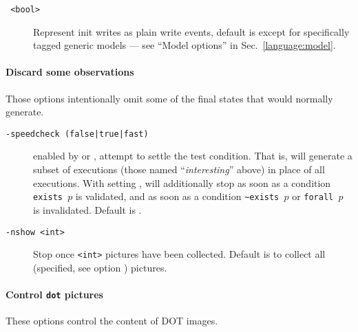 \begin{description}
\item[{\tt {} <bool>}]
Represent init writes as plain write events, default is  except
for specifically tagged generic models --- see ``Model options''
in Sec.~\ref{language:model}.


\end{description}

\paragraph*{Discard some observations}
Those options intentionally omit some of the final states that \herd{} would
normally generate.

\begin{description}
\item[{\tt -speedcheck (false|true|fast)}] 
 enabled by 
or , attempt to settle the test condition.
That is, \herd{} will
generate a subset of executions (those named ``\emph{interesting}'' above)
in place of all executions.
With setting ,
\herd{} will additionally stop as soon as a condition \verb+exists +$p$ is validated, and as soon as a condition \verb+~exists +$p$ or
\verb+forall +$p$ is invalidated. Default is .

\item[{\tt -nshow <int>}]
Stop once \verb+<int>+ pictures have been collected. Default is to
collect all (specified, see option ) pictures.
\end{description}

\paragraph*{Control \texttt{dot} pictures}
These options control the content of DOT images.

